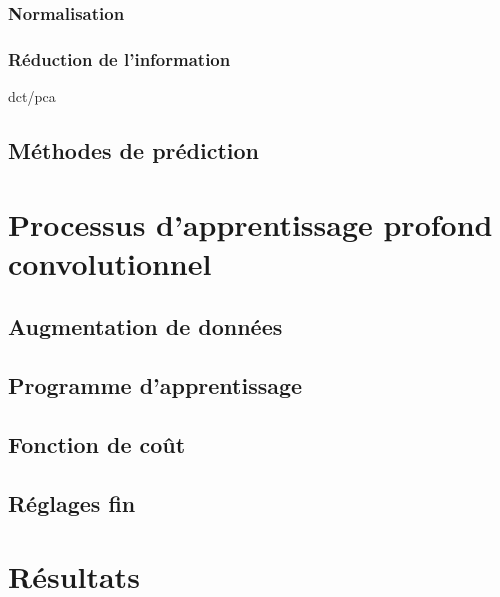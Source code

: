 \subsubsection{Normalisation}
\subsubsection{Réduction de l'information}
dct/pca~\cite{Nanni2017}
\subsection{Méthodes de prédiction}
\section{Processus d'apprentissage profond convolutionnel}
\subsection{Augmentation de données}
\subsection{Programme d'apprentissage}
\subsection{Fonction de coût}
\subsection{Réglages fin}
\section{Résultats}

